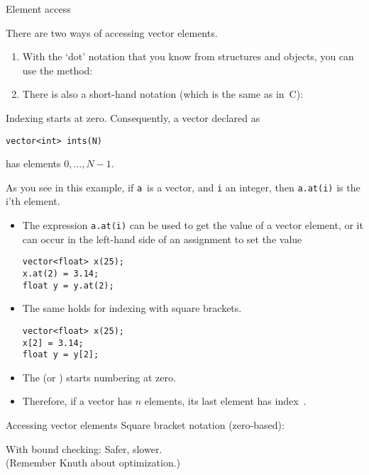  {Element access}

There are two ways of accessing vector elements.
\begin{enumerate}
\item With the `dot' notation that you know from structures and objects, 
  you can use the  method:
\item
  There is also a short-hand notation (which is the same as in~C):
\end{enumerate}

Indexing starts at zero. Consequently, a vector declared as
\begin{lstlisting}
vector<int> ints(N)
\end{lstlisting}
has elements $0,\ldots,N-1$.

As you see in this example,
if \lstinline{a}~is a vector, and \lstinline{i} an integer,
then \lstinline+a.at(i)+ is the i'th element.
\begin{itemize}
\item The expression \lstinline+a.at(i)+ can be used to get the value of a
  vector element, or it can occur in the left-hand side of an
  assignment to set the value
\begin{lstlisting}
vector<float> x(25);
x.at(2) = 3.14;
float y = y.at(2);
\end{lstlisting}
\item The same holds for indexing with square brackets.
\begin{lstlisting}
vector<float> x(25);
x[2] = 3.14;
float y = y[2];
\end{lstlisting}
\item The  (or
  )  starts numbering at zero.
\item Therefore, if a vector has $n$ elements, its last element has
  index~.
\end{itemize}

\begin{slide}{Accessing vector elements}
  \label{sl:vectorsub}
  Square bracket notation (zero-based):

  With bound checking:
  Safer, slower.\\
  (Remember Knuth about optimization.)
\end{slide}

